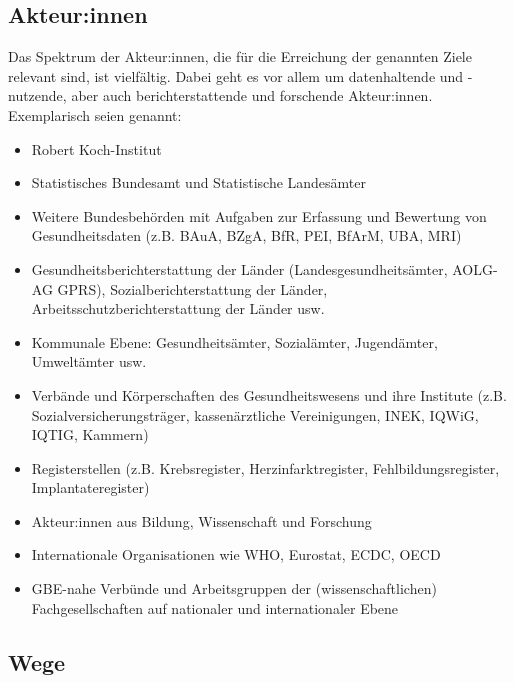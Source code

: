 \documentclass{article}
\begin{document}
\subsection{Akteur:innen}\label{H3491733}



Das Spektrum der Akteur:innen, die für die Erreichung der genannten Ziele relevant sind, ist vielfältig. Dabei geht es vor allem um datenhaltende und -nutzende, aber auch berichterstattende und forschende Akteur:innen. Exemplarisch seien genannt:

\begin{itemize}
\item Robert Koch-Institut


\item Statistisches Bundesamt und Statistische Landesämter


\item Weitere Bundesbehörden mit Aufgaben zur Erfassung und Bewertung von Gesundheitsdaten (z.B. BAuA, BZgA, BfR, PEI, BfArM, UBA, MRI)


\item Gesundheitsberichterstattung der Länder (Landesgesundheitsämter, AOLG-AG GPRS), Sozialberichterstattung der Länder, Arbeitsschutzberichterstattung der Länder usw.


\item Kommunale Ebene: Gesundheitsämter, Sozialämter, Jugendämter, Umweltämter usw.


\item Verbände und Körperschaften des Gesundheitswesens und ihre Institute (z.B. Sozialversicherungsträger, kassenärztliche Vereinigungen, INEK, IQWiG, IQTIG, Kammern)


\item Registerstellen (z.B. Krebsregister, Herzinfarktregister, Fehlbildungsregister, Implantateregister)


\item Akteur:innen aus Bildung, Wissenschaft und Forschung


\item Internationale Organisationen wie WHO, Eurostat, ECDC, OECD


\item GBE-nahe Verbünde und Arbeitsgruppen der (wissenschaftlichen) Fachgesellschaften auf nationaler und internationaler Ebene


\end{itemize}

\subsection{Wege}\label{H4695502}
\end{document}
